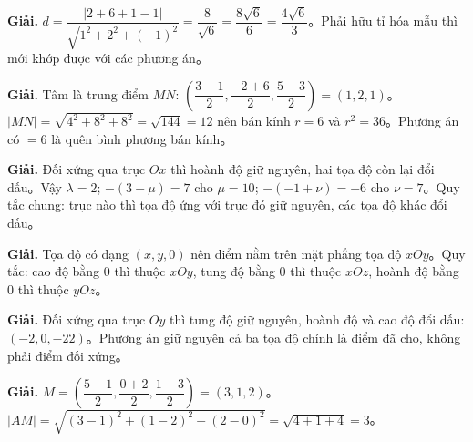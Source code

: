 \documentclass[11pt, a4paper]{article}
\begin{document}
\vspace{0.3cm}
\begin{dapan}[37 — Đáp án D]

\textbf{Giải.} $d=\dfrac{\lvert2+6+1-1\rvert}{\sqrt{1^2+2^2+(-1)^2}}=\dfrac{8}{\sqrt{6}}=\dfrac{8\sqrt{6}}{6}=\dfrac{4\sqrt{6}}{3}$。Phải hữu tỉ hóa mẫu thì mới khớp được với các phương án。


\end{dapan}
\vspace{0.3cm}
\begin{dapan}[38 — Đáp án A]

\textbf{Giải.} Tâm là trung điểm $MN$: $\left(\dfrac{3-1}{2},\dfrac{-2+6}{2},\dfrac{5-3}{2}\right)=(1,2,1)$。$\lvert MN\rvert=\sqrt{4^2+8^2+8^2}=\sqrt{144}=12$ nên bán kính $r=6$ và $r^2=36$。Phương án có $=6$ là quên bình phương bán kính。


\end{dapan}
\vspace{0.3cm}
\begin{dapan}[39 — Đáp án C]

\textbf{Giải.} Đối xứng qua trục $Ox$ thì hoành độ giữ nguyên, hai tọa độ còn lại đổi dấu。Vậy $\lambda=2$; $-(3-\mu)=7$ cho $\mu=10$; $-(-1+\nu)=-6$ cho $\nu=7$。Quy tắc chung: trục nào thì tọa độ ứng với trục đó giữ nguyên, các tọa độ khác đổi dấu。


\end{dapan}
\vspace{0.3cm}
\begin{dapan}[40 — Đáp án B]

\textbf{Giải.} Tọa độ có dạng $(x,y,0)$ nên điểm nằm trên mặt phẳng tọa độ $xOy$。Quy tắc: cao độ bằng $0$ thì thuộc $xOy$, tung độ bằng $0$ thì thuộc $xOz$, hoành độ bằng $0$ thì thuộc $yOz$。


\end{dapan}
\vspace{0.3cm}
\begin{dapan}[41 — Đáp án D]

\textbf{Giải.} Đối xứng qua trục $Oy$ thì tung độ giữ nguyên, hoành độ và cao độ đổi dấu: $(-2,0,-22)$。Phương án giữ nguyên cả ba tọa độ chính là điểm đã cho, không phải điểm đối xứng。


\end{dapan}
\vspace{0.3cm}
\begin{dapan}[42 — Đáp án B]

\textbf{Giải.} $M=\left(\dfrac{5+1}{2},\dfrac{0+2}{2},\dfrac{1+3}{2}\right)=(3,1,2)$。$\lvert AM\rvert=\sqrt{(3-1)^2+(1-2)^2+(2-0)^2}=\sqrt{4+1+4}=3$。


\end{dapan}
\end{document}
